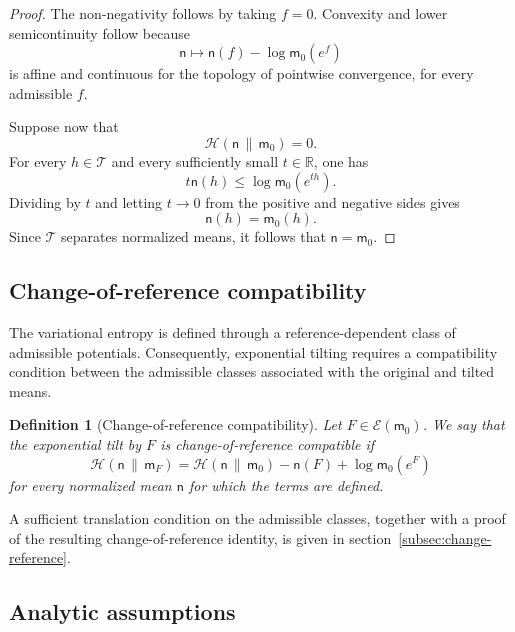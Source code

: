 \documentclass[11pt,reqno]{amsart}
\newtheorem{Definition}[Theorem]{Definition}
\begin{document}
\begin{proof}
The non-negativity follows by taking $f=0$. Convexity and lower
semicontinuity follow because
\[
\mathsf n\longmapsto
\mathsf n(f)-\log\mathsf m_0(e^f)
\]
is affine and continuous for the topology of pointwise convergence, for
every admissible $f$.

Suppose now that
\[
\mathcal H(\mathsf n\,\|\,\mathsf m_0)=0.
\]
For every $h\in\mathcal T$ and every sufficiently small
$t\in\mathbb R$, one has
\[
t\mathsf n(h)
\leq
\log\mathsf m_0(e^{th}).
\]
Dividing by $t$ and letting $t\to0$ from the positive and negative sides
gives
\[
\mathsf n(h)=\mathsf m_0(h).
\]
Since $\mathcal T$ separates normalized means, it follows that
$\mathsf n=\mathsf m_0$.
\end{proof}

\subsection{Change-of-reference compatibility}

The variational entropy is defined through a reference-dependent class
of admissible potentials. Consequently, exponential tilting requires a
compatibility condition between the admissible classes associated with
the original and tilted means.

\begin{Definition}[Change-of-reference compatibility]
\label{def:change-reference-compatible}
Let $F\in\mathcal E(\mathsf m_0)$. We say that the exponential tilt by
$F$ is \emph{change-of-reference compatible} if
\[
\mathcal H(\mathsf n\,\|\,\mathsf m_F)
=
\mathcal H(\mathsf n\,\|\,\mathsf m_0)
-\mathsf n(F)
+\log\mathsf m_0(e^F)
\]
for every normalized mean $\mathsf n$ for which the terms are defined.
\end{Definition}

A sufficient translation condition on the admissible classes, together
with a proof of the resulting change-of-reference identity, is given in
section~\ref{subsec:change-reference}.

\subsection{Analytic assumptions}
\end{document}
